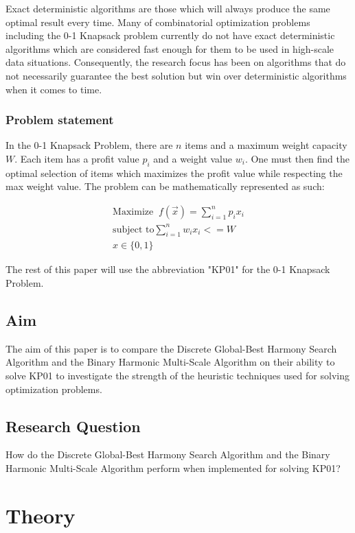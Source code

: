 \documentclass[titlepage]{article}
\begin{document}
Exact deterministic algorithms are those which will always produce the same optimal result every time. Many of combinatorial optimization problems including the 0-1 Knapsack problem currently do not have exact deterministic algorithms which are considered fast enough for them to be used in high-scale data situations. Consequently, the research focus has been on algorithms that do not necessarily guarantee the best solution but win over deterministic algorithms when it comes to time. 

\subsubsection*{Problem statement}
In the 0-1 Knapsack Problem, there are $n$ items and a maximum weight capacity $W$. Each item has a profit value $p_i$ and a weight value $w_i$. One must then find the optimal selection of items which maximizes the profit value while respecting the max weight value. The problem can be mathematically represented as such:

\vskip -0.5cm

\begin{gather}
    \text{Maximize}\;\; f(\Vec{x}) = \sum_{i = 1}^{n} p_i x_i \\
    \text{subject to} \sum_{i = 1}^{n} w_i x_i <= W \\
    x \in \{0, 1\}
\end{gather}

The rest of this paper will use the abbreviation "KP01" for the 0-1 Knapsack Problem. 

\subsection{Aim}
The aim of this paper is to compare the Discrete Global-Best Harmony Search Algorithm and the Binary Harmonic Multi-Scale Algorithm on their ability to solve KP01 to investigate the strength of the heuristic  techniques used for solving optimization problems.

\subsection{Research Question}
How do the Discrete Global-Best Harmony Search Algorithm and the Binary Harmonic Multi-Scale Algorithm perform when implemented for solving KP01?

\newpage

\section{Theory}
\end{document}
